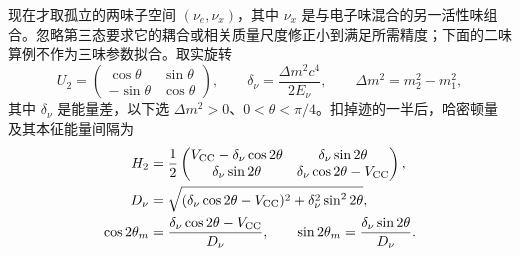 现在才取孤立的两味子空间 $(\nu_e,\nu_x)$，其中 $\nu_x$ 是与电子味混合的另一活性味组合。忽略第三态要求它的耦合或相关质量尺度修正小到满足所需精度；下面的二味算例不作为三味参数拟合。取实旋转
\begin{equation*}
 U_2=\begin{pmatrix}\cos\theta&\sin\theta\\-\sin\theta&\cos\theta\end{pmatrix},
 \qquad \delta_\nu=\frac{\Delta m^2c^4}{2E_\nu},\qquad
 \Delta m^2=m_2^2-m_1^2,
\end{equation*}
其中 $\delta_\nu$ 是能量差，以下选 $\Delta m^2>0$、$0<\theta<\pi/4$。扣掉迹的一半后，哈密顿量及其本征能量间隔为
\begin{equation}
 \begin{aligned}
 H_2&=\frac12\begin{pmatrix}
 V_{\rm CC}-\delta_\nu\cos2\theta&\delta_\nu\sin2\theta\\
 \delta_\nu\sin2\theta&\delta_\nu\cos2\theta-V_{\rm CC}
 \end{pmatrix},\\
 D_\nu&=\sqrt{(\delta_\nu\cos2\theta-V_{\rm CC})^2
                       +\delta_\nu^2\sin^22\theta},\\
 \cos2\theta_m&=\frac{\delta_\nu\cos2\theta-V_{\rm CC}}{D_\nu},\qquad
 \sin2\theta_m=\frac{\delta_\nu\sin2\theta}{D_\nu}.
 \end{aligned}
 \label{eq:sm-matter-two-flavor}
\end{equation}

